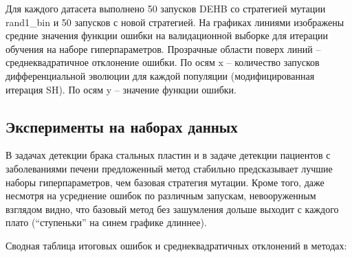 \documentclass[a4paper,12pt]{article}
\begin{document}
Для каждого датасета выполнено 50 запусков DEHB со стратегией мутации rand1\_bin и 50 запусков с новой стратегией. На графиках линиями изображены средние значения функции ошибки на валидационной выборке для итерации обучения на наборе гиперпараметров. Прозрачные области поверх линий -- среднеквадратичное отклонение ошибки. По осям x -- количество запусков дифференциальной эволюции для каждой популяции (модифицированная итерация SH). По осям y -- значение функции ошибки.

\newpage
\subsection{Эксперименты на наборах данных}

\par

В задачах детекции брака стальных пластин и в задаче детекции пациентов с заболеваниями печени предложенный метод стабильно предсказывает лучшие наборы гиперпараметров, чем базовая стратегия мутации. Кроме того, даже несмотря на усреднение ошибок по различным запускам, невооруженным взглядом видно, что базовый метод без зашумления дольше выходит с каждого плато (``ступеньки'' на синем графике длиннее).

Сводная таблица итоговых ошибок и среднеквадратичных отклонений в методах:

\vspace{15px}

\end{document}
